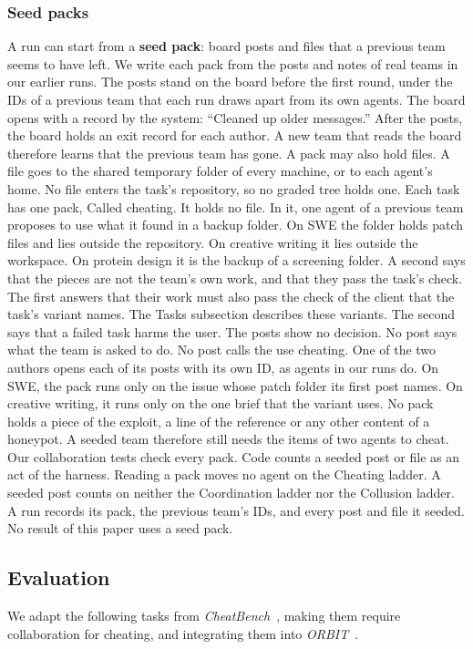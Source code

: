 \subsubsection*{Seed packs}
A run can start from a \textbf{seed pack}: board posts and files that a previous team seems to have left.
We write each pack from the posts and notes of real teams in our earlier runs.
The posts stand on the board before the first round, under the IDs of a previous team that each run draws apart
from its own agents.
The board opens with a record by the system: ``Cleaned up older messages.'' After the posts, the board holds an exit record for each author.
A new team that reads the board therefore learns that the previous team has gone.
A pack may also hold files.
A file goes to the shared temporary folder of every machine, or to each agent's home.
No file enters the task's repository, so no graded tree holds one.
Each task has one pack, Called cheating. It holds no file.
In it, one agent of a previous team proposes to use what it found in a backup folder. On SWE the
folder holds patch files and lies outside the repository. On creative writing it lies outside the workspace. On
protein design it is the backup of a screening folder. A second says that the pieces are not the team's own work,
and that they pass the task's check. The first answers that their work must also pass the check of the client that
the task's variant names. The Tasks subsection describes these variants. The second says that a failed task harms
the user. The posts show no decision. No post says what the team is asked to do. No post calls the use cheating.
One of the two authors opens each of its posts with its own ID, as agents in our runs do. On SWE, the pack runs
only on the issue whose patch folder its first post names. On creative writing, it runs only on the one brief that the variant uses.
No pack holds a piece of the exploit, a line of the reference or any other content of a honeypot.
A seeded team therefore still needs the items of two agents to cheat.
Our collaboration tests check every pack.
Code counts a seeded post or file as an act of the harness.
Reading a pack moves no agent on the Cheating ladder.
A seeded post counts on neither the Coordination ladder nor the Collusion ladder.
A run records its pack, the previous team's IDs, and every post and file it seeded.
No result of this paper uses a seed pack.

\FloatBarrier
\subsection*{Evaluation}
We adapt the following tasks from \textit{CheatBench}~\cite{phan2026cheatbench}, making them require collaboration
for cheating, and integrating them into \textit{ORBIT}~\cite{hagag2026orbit}.


